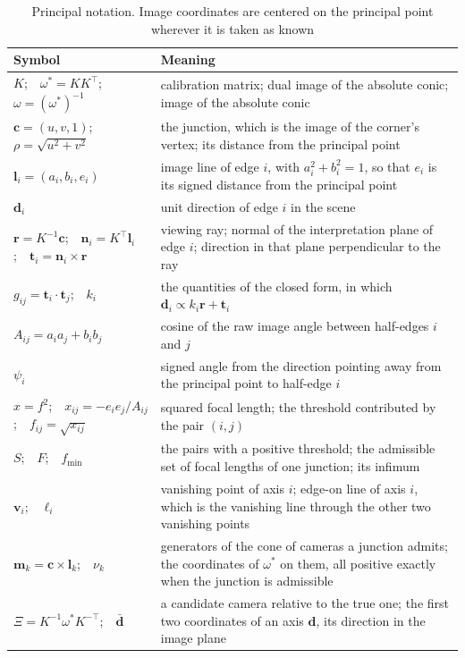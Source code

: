 \documentclass[pdflatex,sn-mathphys-num,iicol]{sn-jnl}
\newcommand{\vd}{\mathbf{d}}
\newcommand{\vr}{\mathbf{r}}
\newcommand{\vt}{\mathbf{t}}
\newcommand{\vn}{\mathbf{n}}
\newcommand{\vl}{\mathbf{l}}
\newcommand{\vc}{\mathbf{c}}
\newcommand{\vv}{\mathbf{v}}
\newcommand{\fmin}{f_{\min}}
\newcommand{\vm}{\mathbf{m}}
\theoremstyle{thmstyleone}
\theoremstyle{thmstylethree}
\theoremstyle{thmstyletwo}
\begin{document}
\begin{table}[t]
\centering\footnotesize
\caption{Principal notation. Image coordinates are centered on the principal point wherever it is taken as known}
\label{tab:notation}
\begin{tabularx}{\linewidth}{@{}l >{\raggedright\arraybackslash}X@{}}
\toprule
Symbol & Meaning \\
\midrule
$K$;\ \ $\omega^{*}=KK^{\top}$;\ \ $\omega=(\omega^{*})^{-1}$ & calibration matrix; dual image of the absolute conic; image of the absolute conic \\
$\vc=(u,v,1)$;\ \ $\rho=\sqrt{u^2+v^2}$ & the junction, which is the image of the corner's vertex; its distance from the principal point \\
$\vl_i=(a_i,b_i,e_i)$ & image line of edge $i$, with $a_i^2+b_i^2=1$, so that $e_i$ is its signed distance from the principal point \\
$\vd_i$ & unit direction of edge $i$ in the scene \\
$\vr=K^{-1}\vc$;\ \ $\vn_i=K^{\top}\vl_i$;\ \ $\vt_i=\vn_i\times\vr$ & viewing ray; normal of the interpretation plane of edge $i$; direction in that plane perpendicular to the ray \\
$g_{ij}=\vt_i\cdot\vt_j$;\ \ $k_i$ & the quantities of the closed form, in which $\vd_i\propto k_i\vr+\vt_i$ \\
$A_{ij}=a_ia_j+b_ib_j$ & cosine of the raw image angle between half-edges $i$ and $j$ \\
$\psi_i$ & signed angle from the direction pointing away from the principal point to half-edge $i$ \\
$x=f^2$;\ \ $x_{ij}=-e_ie_j/A_{ij}$;\ \ $f_{ij}=\sqrt{x_{ij}}$ & squared focal length; the threshold contributed by the pair $(i,j)$ \\
$S$;\ \ $F$;\ \ $\fmin$ & the pairs with a positive threshold; the admissible set of focal lengths of one junction; its infimum \\
$\vv_i$;\ \ $\ell_i$ & vanishing point of axis $i$; edge-on line of axis $i$, which is the vanishing line through the other two vanishing points \\
$\vm_k=\vc\times\vl_k$;\ \ $\nu_k$ & generators of the cone of cameras a junction admits; the coordinates of $\omega^{*}$ on them, all positive exactly when the junction is admissible \\
$\Xi=K^{-1}\omega^{*}K^{-\top}$;\ \ $\bar{\vd}$ & a candidate camera relative to the true one; the first two coordinates of an axis $\vd$, its direction in the image plane \\

\end{tabularx}
\end{table}
\end{document}
